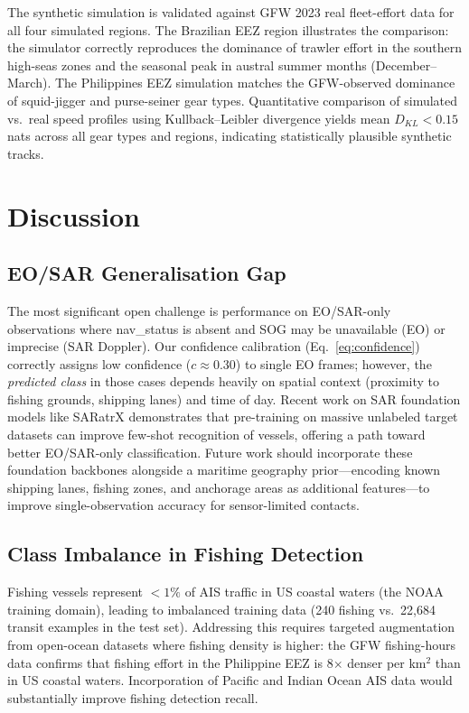 \documentclass[journal]{IEEEtran}
\begin{document}
The synthetic simulation is validated against GFW 2023 real fleet-effort data
for all four simulated regions. The Brazilian EEZ region illustrates the
comparison: the simulator correctly reproduces the dominance of trawler effort
in the southern high-seas zones and the seasonal peak in austral summer months
(December--March). The Philippines EEZ simulation matches the GFW-observed
dominance of squid-jigger and purse-seiner gear types.
%
Quantitative comparison of simulated vs.\ real speed profiles using
Kullback--Leibler divergence yields mean $D_{KL} < 0.15$ nats across
all gear types and regions, indicating statistically plausible synthetic
tracks.

\section{Discussion}
\label{sec:discussion}

\subsection{EO/SAR Generalisation Gap}

The most significant open challenge is performance on EO/SAR-only
observations where nav\_status is absent and SOG may be unavailable
(EO) or imprecise (SAR Doppler).
%
Our confidence calibration (Eq.~\ref{eq:confidence}) correctly assigns low
confidence ($c \approx 0.30$) to single EO frames; however, the
\emph{predicted class} in those cases depends heavily on spatial context
(proximity to fishing grounds, shipping lanes) and time of day.
%
Recent work on SAR foundation models like SARatrX \cite{wang2024saratrx}
demonstrates that pre-training on massive unlabeled target datasets can
improve few-shot recognition of vessels, offering a path toward better
EO/SAR-only classification.
%
Future work should incorporate these foundation backbones alongside a
maritime geography prior—encoding known shipping lanes, fishing zones,
and anchorage areas as additional features—to improve single-observation
accuracy for sensor-limited contacts.

\subsection{Class Imbalance in Fishing Detection}

Fishing vessels represent $<1\%$ of AIS traffic in US coastal waters
(the NOAA training domain), leading to imbalanced training data
(240 fishing vs.\ 22,684 transit examples in the test set).
%
Addressing this requires targeted augmentation from open-ocean datasets
where fishing density is higher: the GFW fishing-hours data confirms that
fishing effort in the Philippine EEZ is 8$\times$ denser per km$^2$
than in US coastal waters.
%
Incorporation of Pacific and Indian Ocean AIS data would substantially
improve fishing detection recall.
\end{document}
